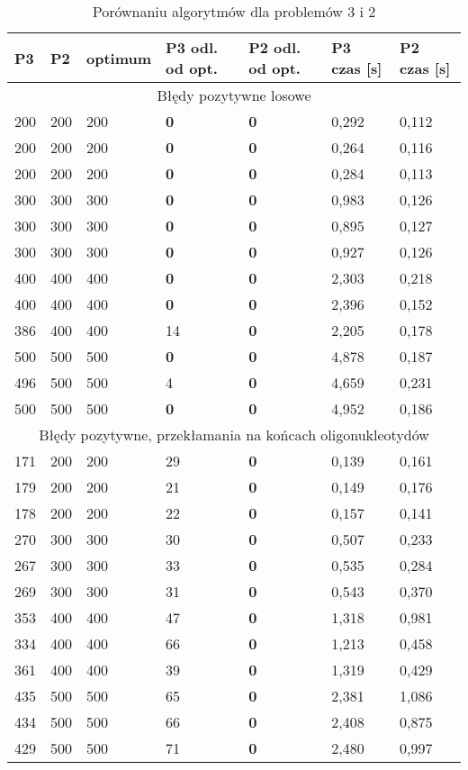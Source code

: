 \documentclass[a4paper]{article}
\begin{document}
\begin{table}[H]
\caption{Porównaniu algorytmów dla problemów 3 i 2}
\begin{tabular}{|p{1.6cm}|p{1.6cm}|p{1.6cm}|p{1.6cm}|p{1.6cm}|p{1.6cm}|p{1.6cm}|}
\hline
\multicolumn{1}{|l|}{P3} & \multicolumn{1}{l|}{P2} &
\multicolumn{1}{l|}{optimum} & \multicolumn{1}{l|}{P3 odl. od opt.} &
\multicolumn{1}{l|}{P2 odl. od opt.} &
\multicolumn{1}{l|}{P3 czas [s]} &
\multicolumn{1}{l|}{P2 czas [s]} \\ \hline
\multicolumn{7}{|c|}{Błędy pozytywne losowe} \\ \hline
200 & 200 & 200 & \textbf{0} & \textbf{0} & 0,292 & 0,112 \\ \hline
200 & 200 & 200 & \textbf{0} & \textbf{0} & 0,264 & 0,116 \\ \hline
200 & 200 & 200 & \textbf{0} & \textbf{0} & 0,284 & 0,113 \\ \hline
300 & 300 & 300 & \textbf{0} & \textbf{0} & 0,983 & 0,126 \\ \hline
300 & 300 & 300 & \textbf{0} & \textbf{0} & 0,895 & 0,127 \\ \hline
300 & 300 & 300 & \textbf{0} & \textbf{0} & 0,927 & 0,126 \\ \hline
400 & 400 & 400 & \textbf{0} & \textbf{0} & 2,303 & 0,218 \\ \hline
400 & 400 & 400 & \textbf{0} & \textbf{0} & 2,396 & 0,152 \\ \hline
386 & 400 & 400 & 14 & \textbf{0} & 2,205 & 0,178 \\ \hline
500 & 500 & 500 & \textbf{0} & \textbf{0} & 4,878 & 0,187 \\ \hline
496 & 500 & 500 & 4 & \textbf{0} & 4,659 & 0,231 \\ \hline
500 & 500 & 500 & \textbf{0} & \textbf{0} & 4,952 & 0,186 \\ \hline
\multicolumn{7}{|c|}{Błędy pozytywne, przekłamania na
końcach oligonukleotydów} \\ \hline
171 & 200 & 200 & 29 & \textbf{0} & 0,139 & 0,161 \\ \hline
179 & 200 & 200 & 21 & \textbf{0} & 0,149 & 0,176 \\ \hline
178 & 200 & 200 & 22 & \textbf{0} & 0,157 & 0,141 \\ \hline
270 & 300 & 300 & 30 & \textbf{0} & 0,507 & 0,233 \\ \hline
267 & 300 & 300 & 33 & \textbf{0} & 0,535 & 0,284 \\ \hline
269 & 300 & 300 & 31 & \textbf{0} & 0,543 & 0,370 \\ \hline
353 & 400 & 400 & 47 & \textbf{0} & 1,318 & 0,981 \\ \hline
334 & 400 & 400 & 66 & \textbf{0} & 1,213 & 0,458 \\ \hline
361 & 400 & 400 & 39 & \textbf{0} & 1,319 & 0,429 \\ \hline
435 & 500 & 500 & 65 & \textbf{0} & 2,381 & 1,086 \\ \hline
434 & 500 & 500 & 66 & \textbf{0} & 2,408 & 0,875 \\ \hline
429 & 500 & 500 & 71 & \textbf{0} & 2,480 & 0,997 \\ \hline
\end{tabular}
\label{}
\end{table}
\end{document}
